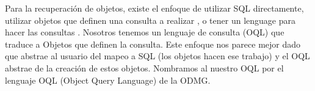 \begin{itemize}
Para la recuperación de objetos, existe el enfoque de utilizar SQL directamente, utilizar objetos que definen una consulta a realizar \cite{cake, RoR}, o tener un lenguage para hacer las consultas \cite{hibernate}.  Nosotros tenemos un lenguaje de consulta (OQL) que traduce a Objetos que definen la consulta. Este enfoque nos parece mejor dado que abstrae al usuario del mapeo a SQL (los objetos hacen ese trabajo) y el OQL abstrae de la creación de estos objetos. Nombramos al nuestro OQL por el lenguaje OQL (Object Query Language) \cite{OQL} de la ODMG.







\end{itemize}